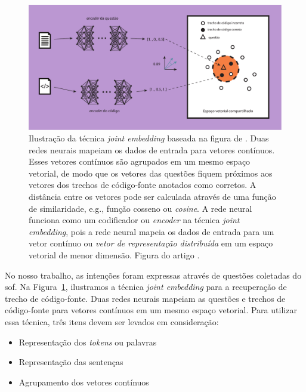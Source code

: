 \begin{figure}[H]
\centering
\includegraphics[width=1\textwidth]{figuras/cap-trabalhos-relacionados/joint_embedding.pdf}
\caption[Ilustração da técnica \textit{joint embedding}]{Ilustração da técnica \textit{joint embedding} baseada na figura de \cite{cambronero-deep-learning-code-search:2019}. Duas redes neurais mapeiam os dados de entrada para vetores contínuos. Esses vetores contínuos são agrupados em um mesmo espaço vetorial, de modo que os vetores das questões fiquem próximos aos vetores dos trechos de código-fonte anotados como corretos. A distância entre os vetores pode ser calculada através de uma função de similaridade, e.g., função cosseno ou \textit{cosine}. A rede neural funciona como um codificador ou \textit{encoder} na técnica \textit{joint embedding}, pois a rede neural mapeia os dados de entrada para um vetor contínuo ou \emph{vetor de representação distribuída} em um espaço vetorial de menor dimensão. Figura do artigo \cite{martins2020concra}.} 
\label{fig:joint-embedding}
\end{figure}

 No nosso trabalho, as intenções foram expressas através de questões coletadas do \Gls{sof}. Na Figura~\ref{fig:joint-embedding}, ilustramos a técnica \textit{joint embedding} para a recuperação de trecho de código-fonte. Duas redes neurais mapeiam as questões e trechos de código-fonte para vetores contínuos em um mesmo espaço vetorial. Para utilizar essa técnica, três itens devem ser levados em consideração:

\begin{itemize}
    \item Representação dos \textit{tokens} ou palavras
    \item Representação das sentenças
    \item Agrupamento dos vetores contínuos 
\end{itemize}


